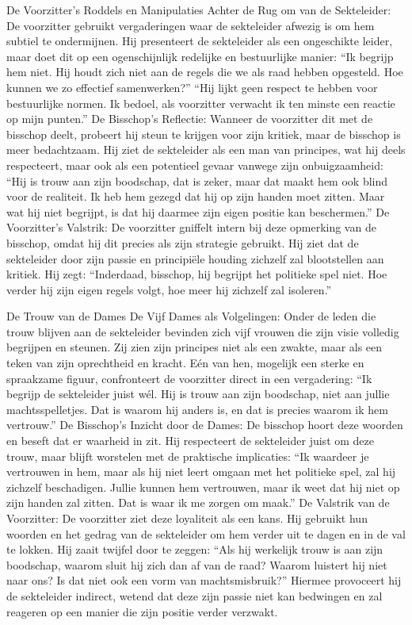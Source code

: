 De Voorzitter’s Roddels en Manipulaties
Achter de Rug om van de Sekteleider:
De voorzitter gebruikt vergaderingen waar de sekteleider afwezig is om hem subtiel te ondermijnen. Hij presenteert de sekteleider als een ongeschikte leider, maar doet dit op een ogenschijnlijk redelijke en bestuurlijke manier:
“Ik begrijp hem niet. Hij houdt zich niet aan de regels die we als raad hebben opgesteld. Hoe kunnen we zo effectief samenwerken?”
“Hij lijkt geen respect te hebben voor bestuurlijke normen. Ik bedoel, als voorzitter verwacht ik ten minste een reactie op mijn punten.”
De Bisschop’s Reflectie:
Wanneer de voorzitter dit met de bisschop deelt, probeert hij steun te krijgen voor zijn kritiek, maar de bisschop is meer bedachtzaam. Hij ziet de sekteleider als een man van principes, wat hij deels respecteert, maar ook als een potentieel gevaar vanwege zijn onbuigzaamheid:
“Hij is trouw aan zijn boodschap, dat is zeker, maar dat maakt hem ook blind voor de realiteit. Ik heb hem gezegd dat hij op zijn handen moet zitten. Maar wat hij niet begrijpt, is dat hij daarmee zijn eigen positie kan beschermen.”
De Voorzitter’s Valstrik:
De voorzitter gniffelt intern bij deze opmerking van de bisschop, omdat hij dit precies als zijn strategie gebruikt. Hij ziet dat de sekteleider door zijn passie en principiële houding zichzelf zal blootstellen aan kritiek. Hij zegt:
“Inderdaad, bisschop, hij begrijpt het politieke spel niet. Hoe verder hij zijn eigen regels volgt, hoe meer hij zichzelf zal isoleren.”

De Trouw van de Dames
De Vijf Dames als Volgelingen:
Onder de leden die trouw blijven aan de sekteleider bevinden zich vijf vrouwen die zijn visie volledig begrijpen en steunen. Zij zien zijn principes niet als een zwakte, maar als een teken van zijn oprechtheid en kracht.
Eén van hen, mogelijk een sterke en spraakzame figuur, confronteert de voorzitter direct in een vergadering:
“Ik begrijp de sekteleider juist wél. Hij is trouw aan zijn boodschap, niet aan jullie machtsspelletjes. Dat is waarom hij anders is, en dat is precies waarom ik hem vertrouw.”
De Bisschop’s Inzicht door de Dames:
De bisschop hoort deze woorden en beseft dat er waarheid in zit. Hij respecteert de sekteleider juist om deze trouw, maar blijft worstelen met de praktische implicaties:
“Ik waardeer je vertrouwen in hem, maar als hij niet leert omgaan met het politieke spel, zal hij zichzelf beschadigen. Jullie kunnen hem vertrouwen, maar ik weet dat hij niet op zijn handen zal zitten. Dat is waar ik me zorgen om maak.”
De Valstrik van de Voorzitter:
De voorzitter ziet deze loyaliteit als een kans. Hij gebruikt hun woorden en het gedrag van de sekteleider om hem verder uit te dagen en in de val te lokken. Hij zaait twijfel door te zeggen:
“Als hij werkelijk trouw is aan zijn boodschap, waarom sluit hij zich dan af van de raad? Waarom luistert hij niet naar ons? Is dat niet ook een vorm van machtsmisbruik?”
Hiermee provoceert hij de sekteleider indirect, wetend dat deze zijn passie niet kan bedwingen en zal reageren op een manier die zijn positie verder verzwakt.

